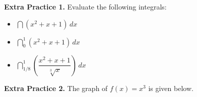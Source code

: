 \documentclass[10pt]{article}
\begin{document}
    



\newpage









{\bf\color{blue}Extra Practice 1.} Evaluate the following integrals:

\begin{itemize}

\item[(a)]   $\dint \left(x^2+x+1\right)\,dx$ \\
\item[(b)]   $\dint_0^1 \left(x^2+x+1\right)\,dx$

\item[(c)]   $\dint_{1/8}^1 \left( \dfrac{x^2+x+1}{\sqrt[3]{x}} \right)\,dx$


\end{itemize}
{\bf\color{blue}Extra Practice 2.}   The graph of $f(x)=x^3$ is given below.\\
\end{document}
